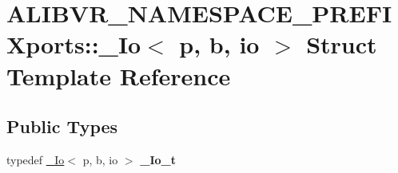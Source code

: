 \hypertarget{structALIBVR__NAMESPACE__PREFIXports_1_1__Io}{}\section{A\+L\+I\+B\+V\+R\+\_\+\+N\+A\+M\+E\+S\+P\+A\+C\+E\+\_\+\+P\+R\+E\+F\+I\+Xports\+:\+:\+\_\+\+Io$<$ p, b, io $>$ Struct Template Reference}
\label{structALIBVR__NAMESPACE__PREFIXports_1_1__Io}
\subsection*{Public Types}
\begin{DoxyCompactItemize}
\item 
typedef \hyperlink{structALIBVR__NAMESPACE__PREFIXports_1_1__Io}{\+\_\+\+Io}$<$ p, b, io $>$ {\bfseries \+\_\+\+Io\+\_\+t}\hypertarget{structALIBVR__NAMESPACE__PREFIXports_1_1__Io_ae229d435579270b34089114cc98f3e00}{}\label{structALIBVR__NAMESPACE__PREFIXports_1_1__Io_ae229d435579270b34089114cc98f3e00}

\end{DoxyCompactItemize}
